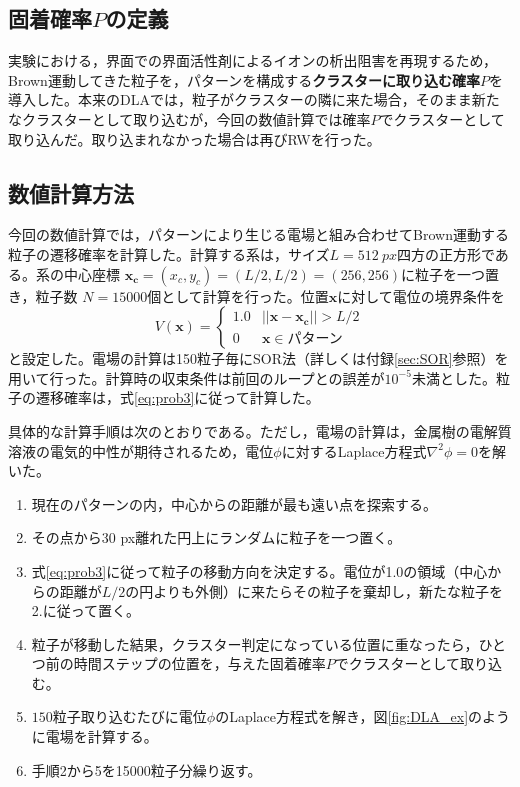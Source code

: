 \documentclass[autodetect-engine,dvi=dvipdfmx,a4paper,ja=standard,oneside,openany,11pt]{bxjsbook}
\begin{document}
\subsection{固着確率$P$の定義}
実験における，界面での界面活性剤によるイオンの析出阻害を再現するため，Brown運動してきた粒子を，パターンを構成する\textbf{クラスターに取り込む確率$P$}を導入した。本来のDLAでは，粒子がクラスターの隣に来た場合，そのまま新たなクラスターとして取り込むが，今回の数値計算では確率$P$でクラスターとして取り込んだ。取り込まれなかった場合は再びRWを行った。
\subsection{数値計算方法}
今回の数値計算では，パターンにより生じる電場と組み合わせてBrown運動する粒子の遷移確率を計算した。計算する系は，サイズ$L=\SI{512}{px}$四方の正方形である。系の中心座標 $\bm{x_c}=(x_c,y_c)=(L/2,L/2)=(256,256)$に粒子を一つ置き，粒子数 $N=15000$個として計算を行った。位置$\bm{x}$に対して電位の境界条件を
\begin{equation}
  V(\bm{x})=
  \begin{cases}
    1.0 & ||\bm{x}-\bm{x_c}||>L/2 \\
    0   & \bm{x}\in\text{パターン}
  \end{cases}
  \label{eq:boundary}
\end{equation}
と設定した。電場の計算は150粒子毎にSOR法（詳しくは付録\ref{sec:SOR}参照）を用いて行った。計算時の収束条件は前回のループとの誤差が$10^{-5}$未満とした。粒子の遷移確率は，式\eqref{eq:prob3}に従って計算した。

具体的な計算手順は次のとおりである。ただし，電場の計算は，金属樹の電解質溶液の電気的中性が期待されるため，電位$\phi$に対するLaplace方程式$\nabla^2\phi=0$を解いた。
\begin{samepage}
  \begin{enumerate}
    \item 現在のパターンの内，中心からの距離が最も遠い点を探索する。
    \item その点から30 px離れた円上にランダムに粒子を一つ置く。
    \item 式\eqref{eq:prob3}に従って粒子の移動方向を決定する。電位が1.0の領域（中心からの距離が$L/2$の円よりも外側）に来たらその粒子を棄却し，新たな粒子を2.に従って置く。
    \item 粒子が移動した結果，クラスター判定になっている位置に重なったら，ひとつ前の時間ステップの位置を，与えた固着確率$P$でクラスターとして取り込む。
    \item $150$粒子取り込むたびに電位$\phi$のLaplace方程式を解き，図\ref{fig:DLA_ex}のように電場を計算する。
    \item 手順2から5を15000粒子分繰り返す。
  \end{enumerate}
\end{samepage}
\end{document}
